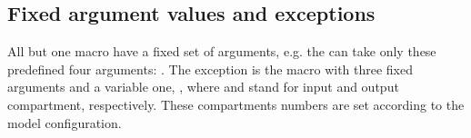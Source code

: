 \begin{itemize}
\end{itemize}


%


\subsection{Fixed argument values and exceptions}
\label{subsec:fixedArguments}
All but one macro have a fixed set of arguments, e.g. the  can take only these predefined
four arguments: . The exception is the  macro with three fixed
arguments  and a variable one, , where  and
 stand for input and output compartment, respectively. These compartments numbers are set 
according to the model configuration. 

